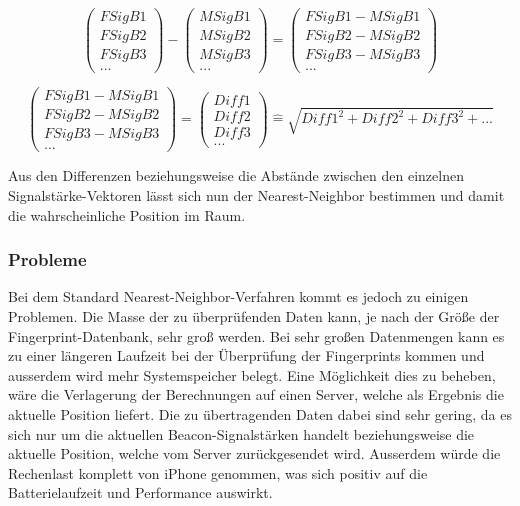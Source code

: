 \begin{equation}
	\begin{pmatrix}
		FSigB1 \\
		FSigB2 \\
		FSigB3 \\
		...
	\end{pmatrix} -
	\begin{pmatrix}
		MSigB1 \\
		MSigB2 \\
		MSigB3 \\
		...
	\end{pmatrix}
	= 
	\begin{pmatrix}
		FSigB1 - MSigB1 \\
		FSigB2 - MSigB2 \\
		FSigB3 - MSigB3 \\
		...
	\end{pmatrix}
\end{equation}

\begin{equation}
	\begin{pmatrix}
		FSigB1 - MSigB1 \\
		FSigB2 - MSigB2 \\
		FSigB3 - MSigB3 \\
		...
	\end{pmatrix}
	=
	\begin{pmatrix}
		Diff1 \\
		Diff2 \\
		Diff3 \\
		...
	\end{pmatrix}
	\widehat{=}
	\sqrt{Diff1^2 + Diff2^2 + Diff3^2 + ...}
\end{equation}

Aus den Differenzen beziehungsweise die Abstände zwischen den einzelnen Signalstärke-Vektoren lässt sich nun der Nearest-Neighbor bestimmen und damit die wahrscheinliche Position im Raum.

\subsubsection{Probleme}
\label{sec:implementation:fingerprinting:positioning:naiv:problems}
Bei dem Standard Nearest-Neighbor-Verfahren kommt es jedoch zu einigen Problemen. 
Die Masse der zu überprüfenden Daten kann, je nach der Größe der Fingerprint-Datenbank, sehr groß werden. Bei sehr großen Datenmengen kann es zu einer längeren Laufzeit bei der Überprüfung der Fingerprints kommen und ausserdem wird mehr Systemspeicher belegt. 
Eine Möglichkeit dies zu beheben, wäre die Verlagerung der Berechnungen auf einen Server, welche als Ergebnis die aktuelle Position liefert. Die zu übertragenden Daten dabei sind sehr gering, da es sich nur um die aktuellen Beacon-Signalstärken handelt beziehungsweise die aktuelle Position, welche vom Server zurückgesendet wird. 
Ausserdem würde die Rechenlast komplett von iPhone genommen, was sich positiv auf die Batterielaufzeit und Performance auswirkt.

